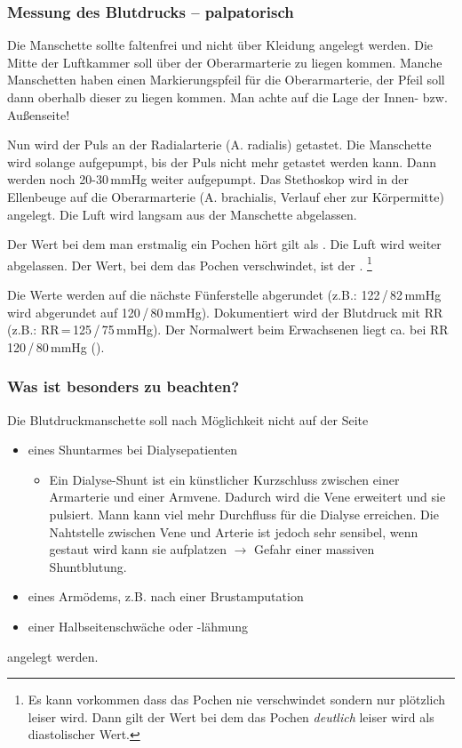 \documentclass{beamer}
\begin{document}
\begin{frame}
\frametitle{Messung des Blutdrucks -- palpatorisch}
\tiny
Die Manschette sollte faltenfrei und nicht über Kleidung angelegt werden. Die
Mitte der Luftkammer soll über der Oberarmarterie zu liegen kommen. Manche
Manschetten haben einen Markierungspfeil für die Oberarmarterie, der Pfeil soll
dann oberhalb dieser zu liegen kommen. Man achte auf die Lage der Innen- bzw.
Außenseite!

Nun wird
der Puls an der Radialarterie (A. radialis) getastet. Die Manschette wird
solange aufgepumpt, bis der Puls nicht mehr getastet werden kann. Dann werden
noch 20-30\,mmHg weiter aufgepumpt. Das Stethoskop wird in der Ellenbeuge auf
die Oberarmarterie (A. brachialis, Verlauf eher zur Körpermitte) angelegt. Die
Luft wird langsam aus der Manschette abgelassen. 

Der Wert bei dem man
erstmalig ein Pochen  hört gilt als
. Die Luft wird weiter abgelassen. Der Wert, bei dem das
Pochen verschwindet, ist der . \footnote{Es kann
vorkommen dass das Pochen nie verschwindet sondern nur plötzlich leiser wird.
Dann gilt der Wert bei dem das Pochen \emph{deutlich} leiser wird als
diastolischer Wert.}

Die
Werte werden auf die nächste Fünferstelle abgerundet (z.B.:
122\,/\,82\,mmHg wird abgerundet auf 120\,/\,80\,mmHg). Dokumentiert
wird der Blutdruck mit RR (z.B.: RR\,=\,125\,/\,75\,mmHg). Der
Normalwert beim Erwachsenen liegt ca. bei RR 120\,/\,80\,mmHg
().
\end{frame}

\begin{frame}
\frametitle{Was ist besonders zu beachten?}
Die Blutdruckmanschette soll nach Möglichkeit nicht auf der Seite
\begin{itemize}
	\item eines Shuntarmes bei Dialysepatienten
	\begin{itemize}
		\item Ein Dialyse-Shunt ist ein künstlicher Kurzschluss
		zwischen einer Armarterie und einer Armvene. Dadurch wird
		die Vene erweitert und sie pulsiert. Mann kann viel mehr
		Durchfluss für die Dialyse erreichen. Die Nahtstelle
		zwischen Vene und Arterie ist jedoch sehr sensibel, wenn
		gestaut wird kann sie aufplatzen $\rightarrow$ Gefahr
		einer massiven Shuntblutung.
	\end{itemize}
		\item eines Armödems, z.B. nach einer
		Brustamputation
		\item einer Halbseitenschwäche oder -lähmung 
\end{itemize}
angelegt werden.



\end{frame}
\end{document}
